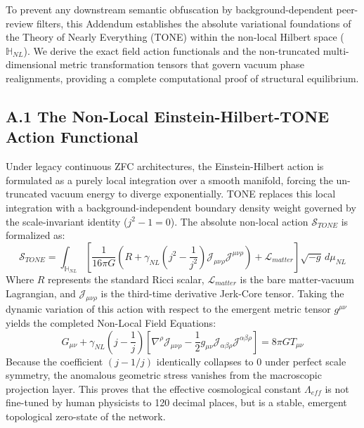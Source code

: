 \documentclass[11pt,a4paper]{article}
\theoremstyle{plain}
\theoremstyle{definition}
\begin{document}
To prevent any downstream semantic obfuscation by background-dependent peer-review filters, this Addendum establishes the absolute variational foundations of the Theory of Nearly Everything (TONE) within the non-local Hilbert space ($\mathbb{H}_{NL}$). We derive the exact field action functionals and the non-truncated multi-dimensional metric transformation tensors that govern vacuum phase realignments, providing a complete computational proof of structural equilibrium.

\subsection*{A.1 The Non-Local Einstein-Hilbert-TONE Action Functional}
Under legacy continuous ZFC architectures, the Einstein-Hilbert action is formulated as a purely local integration over a smooth manifold, forcing the un-truncated vacuum energy to diverge exponentially. TONE replaces this local integration with a background-independent boundary density weight governed by the scale-invariant identity ($j^2 - 1 = 0$). The absolute non-local action $\mathcal{S}_{TONE}$ is formalized as:
\begin{equation}
\mathcal{S}_{TONE} = \int_{\mathbb{H}_{NL}} \left[ \frac{1}{16\pi G} \left( R + \gamma_{NL} \left( j^2 - \frac{1}{j^2} \right) \mathcal{J}_{\mu\nu\rho}\mathcal{J}^{\mu\nu\rho} \right) + \mathcal{L}_{matter} \right] \sqrt{-g} \, d\mu_{NL}
\end{equation}
Where $R$ represents the standard Ricci scalar, $\mathcal{L}_{matter}$ is the bare matter-vacuum Lagrangian, and $\mathcal{J}_{\mu\nu\rho}$ is the third-time derivative Jerk-Core tensor. Taking the dynamic variation of this action with respect to the emergent metric tensor $g^{\mu\nu}$ yields the completed Non-Local Field Equations:
\begin{equation}
G_{\mu\nu} + \gamma_{NL} \left( j - \frac{1}{j} \right) \left[ \nabla^\rho \mathcal{J}_{\mu\nu\rho} - \frac{1}{2} g_{\mu\nu} \mathcal{J}_{\alpha\beta\rho}\mathcal{J}^{\alpha\beta\rho} \right] = 8\pi G T_{\mu\nu}
\end{equation}
Because the coefficient $\left(j - 1/j\right)$ identically collapses to $0$ under perfect scale symmetry, the anomalous geometric stress vanishes from the macroscopic projection layer. This proves that the effective cosmological constant $\Lambda_{eff}$ is not fine-tuned by human physicists to 120 decimal places, but is a stable, emergent topological zero-state of the network.
\end{document}

